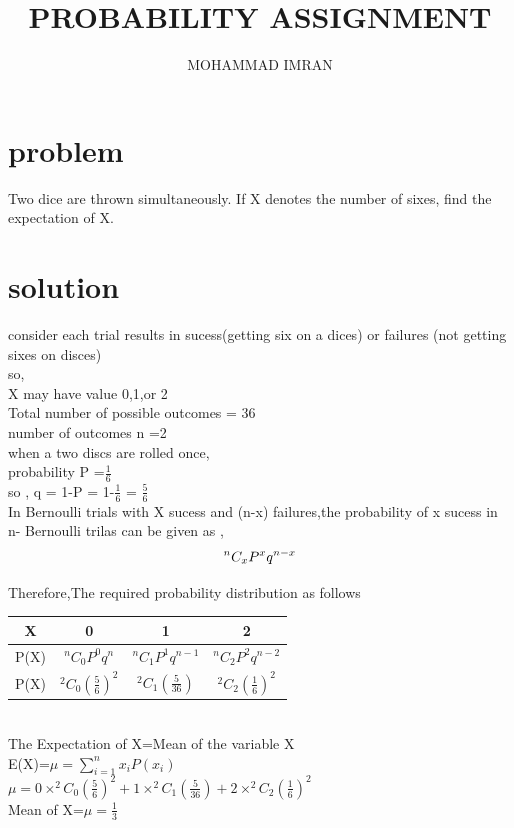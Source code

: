 \documentclass[journal,12pt,twocolumn]{article}
\title{PROBABILITY ASSIGNMENT}
\author{MOHAMMAD IMRAN}
\begin{document}
\maketitle
\tableofcontents
\bigskip


 \section{problem }
 Two dice are thrown simultaneously. If X denotes the number of sixes, find the
expectation of X.

\section{solution }
consider each trial results in sucess(getting six on a dices) or failures (not getting sixes on disces)\\
so,\\
X may have value 0,1,or 2\\
Total number of possible outcomes = 36\\
number of outcomes n =2\\
when a  two discs are rolled once,\\

probability  P =$\frac{1}{6}$\\


 so , q = 1-P = 1-$\frac{1}{6}$ = $\frac{5}{6}$\\
 
 In Bernoulli trials with X sucess and (n-x) failures,the probability of x sucess in n- Bernoulli trilas can be given as ,
 \begin{equation}
 \textbf{$^nC_xP^xq^{n-x}$}\\
\end{equation}

Therefore,The required probability distribution as follows\\


 \begin{tabular}{ |c |c |c |c |}
 \hline
 X  &  0  &  1  &  2\\
 \hline
 
 P(X)  &  $^nC_0P^0q^n$  &  $^nC_1P^1q^{n-1}$  &  $^nC_2P^2q^{n-2}$\\
 \hline
 
 P(X)  &   $^2C_0(\frac{5}{6})^2$ &  $^2C_1(\frac{5}{36})$ &   $^2C_2(\frac{1}{6})^2$ \\
 \hline
 
 \end{tabular}\\
 
 
 The Expectation of X=Mean of the variable X \\
 
 
  E(X)=$\mu=\sum_{i=1}^{n} x_i P(x_i)$\\
 

 $\mu=0\times^2C_0(\frac{5}{6})^2+1\times^2C_1(\frac{5}{36})+2\times^2C_2(\frac{1}{6})^2$\\
 
 
 Mean of X=$\mu=\frac{1}{3}$
 
\end{document}
